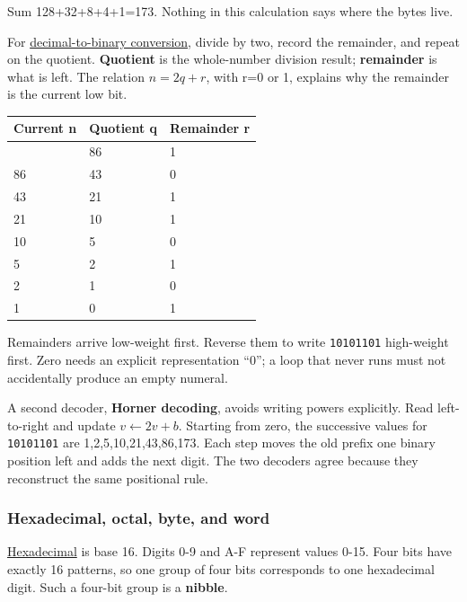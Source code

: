 Sum 128+32+8+4+1=173. Nothing in this calculation says where the bytes live.

For \hyperref[appendix-dc552784a2c0]{decimal-to-binary conversion}, divide by two, record the remainder, and repeat on the quotient. \textbf{Quotient} is the whole-number division result; \textbf{remainder} is what is left. The relation \(n=2q+r\), with r=0 or 1, explains why the remainder is the current low bit.

{\def\LTcaptype{none} %
\begin{longtable}[]{@{}lll@{}}
\toprule\noalign{}
Current n & Quotient q & Remainder r \\
\midrule\noalign{}
\endhead
\bottomrule\noalign{}
\endlastfoot
173 & 86 & 1 \\
86 & 43 & 0 \\
43 & 21 & 1 \\
21 & 10 & 1 \\
10 & 5 & 0 \\
5 & 2 & 1 \\
2 & 1 & 0 \\
1 & 0 & 1 \\
\end{longtable}
}

Remainders arrive low-weight first. Reverse them to write \texttt{10101101} high-weight first. Zero needs an explicit representation ``0''; a loop that never runs must not accidentally produce an empty numeral.

A second decoder, \textbf{Horner decoding}, avoids writing powers explicitly. Read left-to-right and update \(v\leftarrow2v+b\). Starting from zero, the successive values for \texttt{10101101} are 1,2,5,10,21,43,86,173. Each step moves the old prefix one binary position left and adds the next digit. The two decoders agree because they reconstruct the same positional rule.

\subsubsection{Hexadecimal, octal, byte, and word}\label{01-foundations-i-ch001-hexadecimal-octal-byte-and-word}

\hypertarget{01-foundations-i-ch001-hexadecimal-octal-byte-and-word}{}

\hyperref[appendix-6b8075763724]{Hexadecimal} is base 16. Digits 0-9 and A-F represent values 0-15. Four bits have exactly 16 patterns, so one group of four bits corresponds to one hexadecimal digit. Such a four-bit group is a \textbf{nibble}.

